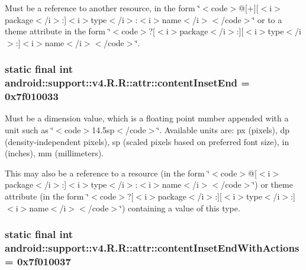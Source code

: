 Must be a reference to another resource, in the form \char`\"{}$<$code$>$@\mbox{[}+\mbox{]}\mbox{[}$<$i$>$package$<$/i$>$:\mbox{]}$<$i$>$type$<$/i$>$:$<$i$>$name$<$/i$>$$<$/code$>$\char`\"{} or to a theme attribute in the form \char`\"{}$<$code$>$?\mbox{[}$<$i$>$package$<$/i$>$:\mbox{]}\mbox{[}$<$i$>$type$<$/i$>$:\mbox{]}$<$i$>$name$<$/i$>$$<$/code$>$\char`\"{}. \hypertarget{classandroid_1_1support_1_1v4_1_1_r_1_1attr_3fb28547967fbbce01280d565b1a46b4}{
\subsubsection[{contentInsetEnd}]{\setlength{\rightskip}{0pt plus 5cm}static final int android::support::v4.R.R::attr::contentInsetEnd = 0x7f010033}}
\label{classandroid_1_1support_1_1v4_1_1_r_1_1attr_3fb28547967fbbce01280d565b1a46b4}


Must be a dimension value, which is a floating point number appended with a unit such as \char`\"{}$<$code$>$14.5sp$<$/code$>$\char`\"{}. Available units are: px (pixels), dp (density-independent pixels), sp (scaled pixels based on preferred font size), in (inches), mm (millimeters). 

This may also be a reference to a resource (in the form \char`\"{}$<$code$>$@\mbox{[}$<$i$>$package$<$/i$>$:\mbox{]}$<$i$>$type$<$/i$>$:$<$i$>$name$<$/i$>$$<$/code$>$\char`\"{}) or theme attribute (in the form \char`\"{}$<$code$>$?\mbox{[}$<$i$>$package$<$/i$>$:\mbox{]}\mbox{[}$<$i$>$type$<$/i$>$:\mbox{]}$<$i$>$name$<$/i$>$$<$/code$>$\char`\"{}) containing a value of this type. \hypertarget{classandroid_1_1support_1_1v4_1_1_r_1_1attr_ab49a20b8860361c6adbef033c3c8d10}{
\subsubsection[{contentInsetEndWithActions}]{\setlength{\rightskip}{0pt plus 5cm}static final int android::support::v4.R.R::attr::contentInsetEndWithActions = 0x7f010037}}
\label{classandroid_1_1support_1_1v4_1_1_r_1_1attr_ab49a20b8860361c6adbef033c3c8d10}


